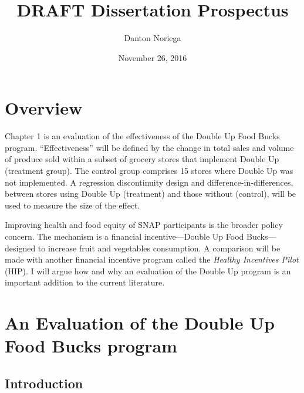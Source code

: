 \documentclass[12pt,letterpaperpaper,]{book}
\title{DRAFT Dissertation Prospectus}
\author{Danton Noriega}
\date{November 26, 2016}
\begin{document}
\maketitle

\setlength{\abovedisplayskip}{-5pt}
\setlength{\abovedisplayshortskip}{-5pt}
\mainmatter

{
\setcounter{tocdepth}{2}
\tableofcontents
}
\chapter*{Overview}\label{overview}

Chapter 1 is an evaluation of the effectiveness of the Double Up Food
Bucks program. ``Effectiveness'' will be defined by the change in total
sales and volume of produce sold within a subset of grocery stores that
implement Double Up (treatment group). The control group comprises 15
stores where Double Up was not implemented. A regression discontinuity
design and difference-in-differences, between stores using Double Up
(treatment) and those without (control), will be used to measure the
size of the effect.

Improving health and food equity of SNAP participants is the broader
policy concern. The mechanism is a financial incentive---Double Up Food
Bucks---designed to increase fruit and vegetables consumption. A
comparison will be made with another financial incentive program called
the \emph{Healthy Incentives Pilot} (HIP). I will argue how and why an
evaluation of the Double Up program is an important addition to the
current literature.

\chapter{An Evaluation of the Double Up Food Bucks
program}\label{chapter-1}

\section*{Introduction}\label{intro-1}
\end{document}
